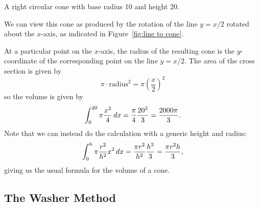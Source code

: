 \begin{marginfigure}
\caption{A right circular cone with base radius 10 and height 20.}
\label{fig:line to cone}
\end{marginfigure}


\begin{solution}
We can view this cone as produced by the rotation of the line
$y=x/2$ rotated about the $x$-axis, as indicated in
Figure~\ref{fig:line to cone}.

At a particular point on the $x$-axis, the radius of the resulting
cone is the $y$-coordinate of the corresponding point on the line
$y=x/2$. The area of the cross section is given by
\[
\pi \cdot \text{radius}^2 = \pi \left(\frac{x}{2}\right)^2
\]
so the volume is given by
$$
  \int_0^{20} \pi
  {x^2\over4}\, d x={\pi\over4}{20^3\over3}={2000\pi\over3}.
$$ 
Note that we can instead do the calculation with a generic height and
radius: 
$$
  \int_0^{h} \pi{r^2\over h^2}x^2\, d x
  ={\pi r^2\over h^2}{h^3\over3}={\pi r^2h\over3},
$$ 
giving us the usual formula for the volume of a cone.
\end{solution}








\subsection{The Washer Method}

